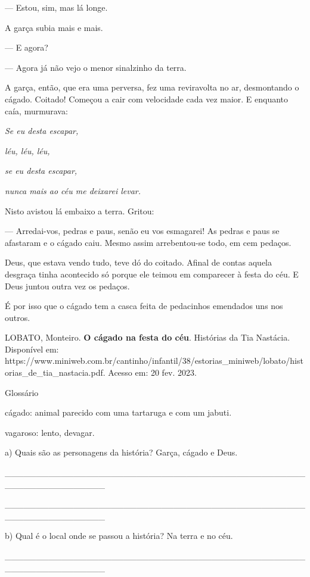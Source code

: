 --- Estou, sim, mas lá longe.

A garça subia mais e mais.

--- E agora?

--- Agora já não vejo o menor sinalzinho da terra.

A garça, então, que era uma perversa, fez uma reviravolta no ar,
desmontando o cágado. Coitado! Começou a cair com velocidade cada vez
maior. E enquanto caía, murmurava:

\emph{Se eu desta escapar,}

\emph{léu, léu, léu,}

\emph{se eu desta escapar,}

\emph{nunca mais ao céu me deixarei levar.}

Nisto avistou lá embaixo a terra. Gritou:

--- Arredai-vos, pedras e paus, senão eu vos esmagarei! As pedras e paus
se afastaram e o cágado caiu. Mesmo assim arrebentou-se todo, em cem
pedaços.

Deus, que estava vendo tudo, teve dó do coitado. Afinal de contas aquela
desgraça tinha acontecido só porque ele teimou em comparecer à festa do
céu. E Deus juntou outra vez os pedaços.

É por isso que o cágado tem a casca feita de pedacinhos emendados uns
nos outros.

LOBATO, Monteiro. \textbf{O cágado na festa do céu}. Histórias da Tia
Nastácia. Disponível em:
https://www.miniweb.com.br/cantinho/infantil/38/estorias\_miniweb/lobato/historias\_de\_tia\_nastacia.pdf.
Acesso em: 20 fev. 2023.

Glossário

cágado: animal parecido com uma tartaruga e com um jabuti.

vagaroso: lento, devagar.

a) Quais são as personagens da história? Garça, cágado e Deus.

\_\_\_\_\_\_\_\_\_\_\_\_\_\_\_\_\_\_\_\_\_\_\_\_\_\_\_\_\_\_\_\_\_\_\_\_\_\_\_\_\_\_\_\_\_\_\_\_\_\_\_\_\_\_\_\_\_\_\_\_\_\_\_\_

\_\_\_\_\_\_\_\_\_\_\_\_\_\_\_\_\_\_\_\_\_\_\_\_\_\_\_\_\_\_\_\_\_\_\_\_\_\_\_\_\_\_\_\_\_\_\_\_\_\_\_\_\_\_\_\_\_\_\_\_\_\_\_\_

b) Qual é o local onde se passou a história? Na terra e no céu.

\_\_\_\_\_\_\_\_\_\_\_\_\_\_\_\_\_\_\_\_\_\_\_\_\_\_\_\_\_\_\_\_\_\_\_\_\_\_\_\_\_\_\_\_\_\_\_\_\_\_\_\_\_\_\_\_\_\_\_\_\_\_\_\_


